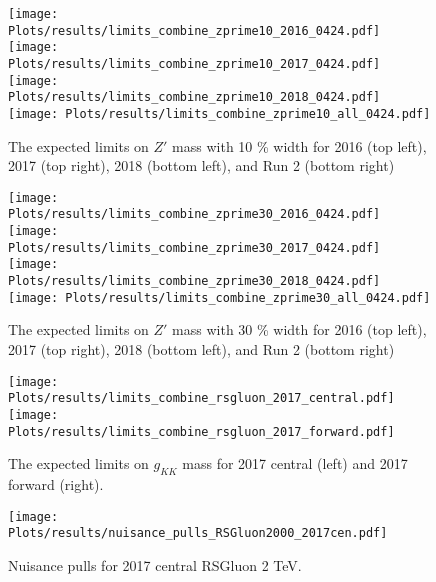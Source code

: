 \begin{figure}[!htbp]
	\begin{center}
		\texttt{[image: Plots/results/limits\_combine\_zprime10\_2016\_0424.pdf]} 
		\texttt{[image: Plots/results/limits\_combine\_zprime10\_2017\_0424.pdf]} \\
		\texttt{[image: Plots/results/limits\_combine\_zprime10\_2018\_0424.pdf]}
		\texttt{[image: Plots/results/limits\_combine\_zprime10\_all\_0424.pdf]} 
		
		\caption{ The expected limits on $Z'$  mass  with 10 \% width for 2016 (top left),  2017 (top right),  2018 (bottom left), and  Run 2 (bottom right)}
		\label{fig:limits_on_zprime10}
	\end{center}
\end{figure}



\begin{figure}[!htbp]
	\begin{center}
		\texttt{[image: Plots/results/limits\_combine\_zprime30\_2016\_0424.pdf]} 
		\texttt{[image: Plots/results/limits\_combine\_zprime30\_2017\_0424.pdf]} \\
		\texttt{[image: Plots/results/limits\_combine\_zprime30\_2018\_0424.pdf]}
		\texttt{[image: Plots/results/limits\_combine\_zprime30\_all\_0424.pdf]} 
		
		\caption{ The expected limits on $Z'$  mass   with 30 \% width for 2016 (top left),  2017 (top right),  2018 (bottom left), and  Run 2 (bottom right)}
		\label{fig:limits_on_zprime30}
	\end{center}
\end{figure}


\begin{figure}[!htbp]
	\begin{center}
		\texttt{[image: Plots/results/limits\_combine\_rsgluon\_2017\_central.pdf]}
		\texttt{[image: Plots/results/limits\_combine\_rsgluon\_2017\_forward.pdf]}
		
		\caption{ The expected limits on $g_{KK}$ mass for 2017 central (left) and 2017 forward (right).}
		\label{fig:limits_on_RS_gluons_2017}
	\end{center}
\end{figure}

\begin{figure}[!htbp]
	\begin{center}
		\texttt{[image: Plots/results/nuisance\_pulls\_RSGluon2000\_2017cen.pdf]}
		\caption{ Nuisance pulls for 2017 central RSGluon 2 TeV.}
		\label{fig:nuisance_pulls_2017}
	\end{center}
\end{figure}
